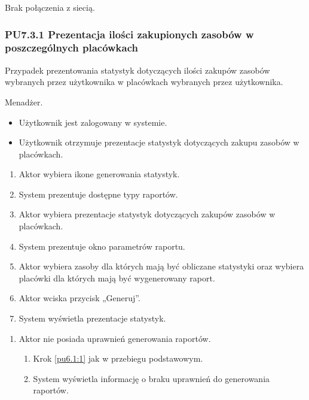 Brak połączenia z siecią.

\subsubsection{PU7.3.1 Prezentacja ilości zakupionych zasobów w poszczególnych placówkach}
Przypadek prezentowania statystyk dotyczących ilości zakupów zasobów wybranych przez użytkownika w placówkach wybranych przez użytkownika.

Menadżer.

\begin{itemize}
\item Użytkownik jest zalogowany w systemie.
\end{itemize}

\begin{itemize}
\item Użytkownik otrzymuje prezentacje statystyk dotyczących zakupu zasobów w placówkach.
\end{itemize}

\begin{enumerate}
	\item \label{pu7.3.1:1} Aktor wybiera ikone generowania statystyk.
	\item System prezentuje dostępne typy raportów.
	\item \label{pu7.3.1:2} Aktor wybiera prezentacje statystyk dotyczących zakupów zasobów w placówkach.
	\item System prezentuje okno parametrów raportu.
	\item Aktor wybiera zasoby dla których mają być obliczane statystyki oraz wybiera placówki dla których mają być wygenerowany raport.
	\item Aktor wciska przycisk „Generuj”.
	\item System wyświetla prezentacje statystyk.
\end{enumerate}

\begin{enumerate}
	\item Aktor nie posiada uprawnień generowania raportów.
	\begin{enumerate}[label*=\arabic*.]
		\item Krok \ref{pu6.1:1} jak w przebiegu podstawowym.
		\item System wyświetla informację o braku uprawnień do generowania raportów.
	\end{enumerate}
\end{enumerate}

